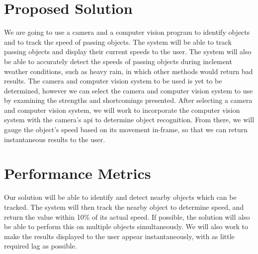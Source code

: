 \documentclass[letterpaper,10pt,onecolumn,draftclsnofoot]{IEEEtran}
\begin{document}
\section{Proposed Solution}

We are going to use a camera and a computer vision program to identify objects and to track the speed of passing objects.
 The system will be able to track passing objects and display their current speeds to the user.
 The system will also be able to accurately detect the speeds of passing objects during inclement weather conditions, such as heavy rain, in which other methods would return bad results.
 The camera and computer vision system to be used is yet to be determined, however we can select the camera and computer vision system to use by examining the strengths and shortcomings presented.
 After selecting a camera and computer vision system, we will work to incorporate the computer vision system with the camera’s api to determine object recognition.
 From there, we will gauge the object’s speed based on its movement in-frame, so that we can return instantaneous results to the user.
 

\section{Performance Metrics}

Our solution will be able to identify and detect nearby objects which can be tracked.
 The system will then track the nearby object to determine speed, and return the value within 10\% of its actual speed.
 If possible, the solution will also be able to perform this on multiple objects simultaneously.
 We will also work to make the results displayed to the user appear instantaneously, with as little required lag as possible.

 
\end{document}
